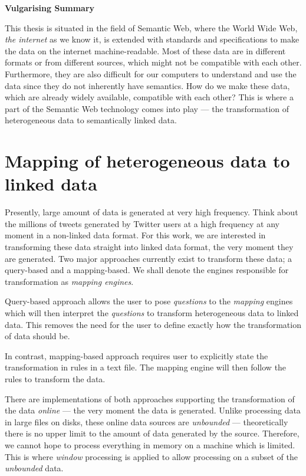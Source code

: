 \newpage
{}
{}
\noindent \textbf{\huge Vulgarising Summary }

\vspace{1.5cm}
This thesis is situated in the field of Semantic Web, where the 
World Wide Web, \emph{the internet} as we know it, is extended 
with standards and specifications to make the data on 
the internet machine-readable. Most of these data are in different 
formats or from different sources,
which might not be compatible with each other. Furthermore, 
they are also difficult for our computers to understand and use the 
data since they do not inherently have semantics.  
How do we make these data, which are already widely available, 
compatible with each other? This is where a part of 
the Semantic Web technology comes into play --- the 
transformation of heterogeneous data to semantically linked data. 


\section*{Mapping of heterogeneous data to linked data}

Presently, large amount of data is generated at very high frequency. 
Think about the millions of tweets generated by Twitter users at a high 
frequency at any moment in a non-linked data format. For this work, we 
are interested in transforming these data straight into linked data format, 
the very moment they are generated. Two major approaches currently exist 
to transform these data; a query-based and a mapping-based. We shall denote 
the engines responsible for transformation as \emph{mapping engines}.  

Query-based approach allows the user to pose \emph{questions} 
to the \emph{mapping}
engines which will then interpret the \emph{questions} to transform 
heterogeneous data to linked data. This removes the need for the user 
to define exactly how the transformation of data should be. 

In contrast, mapping-based approach requires user to explicitly 
state the transformation in rules in a text file. 
The mapping engine will then follow the rules to transform the data. 

There are implementations of both approaches supporting 
the transformation of the data \emph{online} --- the very moment 
the data is generated. Unlike processing data in large files on disks, 
these online data sources are \emph{unbounded} --- theoretically there is no 
upper limit to the amount of data generated by the source. Therefore, 
we cannot hope to process everything in memory on a machine which is limited.
This is where \emph{window} processing is applied to allow processing on a 
subset of the \emph{unbounded} data. 


